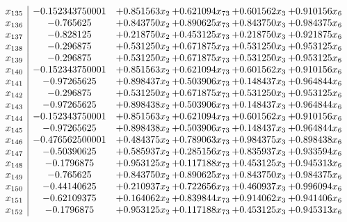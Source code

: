\documentclass[11pt]{article}
\begin{document}
\[\begin{array}{c| c c@{\hskip 2pt} c@{\hskip 2pt} c@{\hskip 2pt} c@{\hskip 2pt} }
 x_{135}   &  -0.152343750001 & + 0.851563 x_{2} & + 0.621094 x_{73} & + 0.601562 x_{3} & + 0.910156 x_{6}\\
 x_{136}   &  -0.765625 & + 0.843750 x_{2} & + 0.890625 x_{73} & + 0.843750 x_{3} & + 0.984375 x_{6}\\
 x_{137}   &  -0.828125 & + 0.218750 x_{2} & + 0.453125 x_{73} & + 0.218750 x_{3} & + 0.921875 x_{6}\\
 x_{138}   &  -0.296875 & + 0.531250 x_{2} & + 0.671875 x_{73} & + 0.531250 x_{3} & + 0.953125 x_{6}\\
 x_{139}   &  -0.296875 & + 0.531250 x_{2} & + 0.671875 x_{73} & + 0.531250 x_{3} & + 0.953125 x_{6}\\
 x_{140}   &  -0.152343750001 & + 0.851563 x_{2} & + 0.621094 x_{73} & + 0.601562 x_{3} & + 0.910156 x_{6}\\
 x_{141}   &  -0.97265625 & + 0.898437 x_{2} & + 0.503906 x_{73} & + 0.148437 x_{3} & + 0.964844 x_{6}\\
 x_{142}   &  -0.296875 & + 0.531250 x_{2} & + 0.671875 x_{73} & + 0.531250 x_{3} & + 0.953125 x_{6}\\
 x_{143}   &  -0.97265625 & + 0.898438 x_{2} & + 0.503906 x_{73} & + 0.148437 x_{3} & + 0.964844 x_{6}\\
 x_{144}   &  -0.152343750001 & + 0.851563 x_{2} & + 0.621094 x_{73} & + 0.601562 x_{3} & + 0.910156 x_{6}\\
 x_{145}   &  -0.97265625 & + 0.898438 x_{2} & + 0.503906 x_{73} & + 0.148437 x_{3} & + 0.964844 x_{6}\\
 x_{146}   &  -0.476562500001 & + 0.484375 x_{2} & + 0.789063 x_{73} & + 0.984375 x_{3} & + 0.898438 x_{6}\\
 x_{147}   &  -0.50390625 & + 0.585937 x_{2} & + 0.285156 x_{73} & + 0.835937 x_{3} & + 0.933594 x_{6}\\
 x_{148}   &  -0.1796875 & + 0.953125 x_{2} & + 0.117188 x_{73} & + 0.453125 x_{3} & + 0.945313 x_{6}\\
 x_{149}   &  -0.765625 & + 0.843750 x_{2} & + 0.890625 x_{73} & + 0.843750 x_{3} & + 0.984375 x_{6}\\
 x_{150}   &  -0.44140625 & + 0.210937 x_{2} & + 0.722656 x_{73} & + 0.460937 x_{3} & + 0.996094 x_{6}\\
 x_{151}   &  -0.62109375 & + 0.164062 x_{2} & + 0.839844 x_{73} & + 0.914062 x_{3} & + 0.941406 x_{6}\\
 x_{152}   &  -0.1796875 & + 0.953125 x_{2} & + 0.117188 x_{73} & + 0.453125 x_{3} & + 0.945313 x_{6}\\

\end{array}\]
\end{document}
